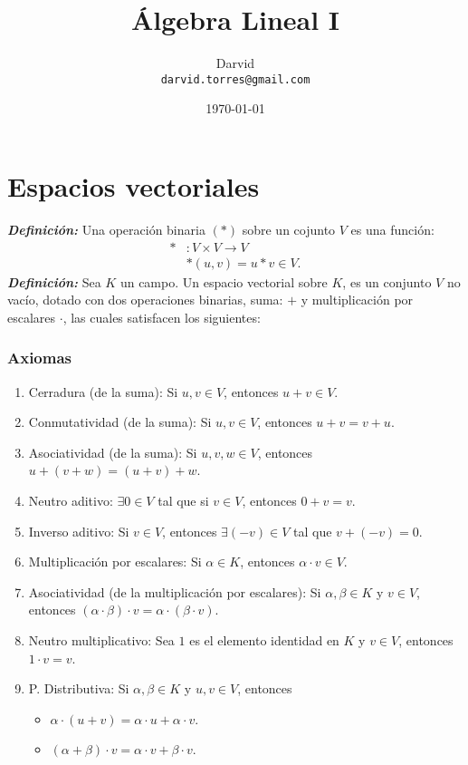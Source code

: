 \documentclass[11pt]{article}
\newcommand{\bfit}[1]{\textbf{\textit{#1}}}
\begin{document}
\title{Álgebra Lineal I}
\author{Darvid \\ \texttt{darvid.torres@gmail.com}}
\date{\today}
\maketitle
\thispagestyle{empty}

\part*{Espacios vectoriales}

\bfit{Definición:} Una operación binaria $(*)$ sobre un cojunto $V$ es una función:
\begin{align*}
 * &: V \times V \to V\\
 &*(u,v) = u*v\in V.
\end{align*}
\bfit{Definición:}  Sea $K$ un campo. Un espacio vectorial sobre $K$, es un conjunto $V$ no vacío, dotado con dos operaciones binarias, suma: $+$ y multiplicación por escalares $\cdot$, las cuales satisfacen los siguientes:

\section*{Axiomas}

\begin{enumerate}
    \item Cerradura (de la suma): Si $u,v\in V$, entonces $u+v \in V$.
    \item Conmutatividad (de la suma): Si $u,v\in V$, entonces $u+v=v+u$.
    \item Asociatividad (de la suma): Si $u,v,w\in V$, entonces $u+(v+w)=(u+v)+w$.
    \item Neutro aditivo: $\exists 0\in V$ tal que si $v\in V$, entonces $0+v=v$.
    \item Inverso aditivo: Si $v\in V$, entonces $\exists (-v)\in V$ tal que $v+(-v)=0$.
    \item Multiplicación por escalares: Si $\alpha \in K$, entonces $\alpha \cdot v\in V$.
    \item Asociatividad (de la multiplicación por escalares): Si $\alpha, \beta\in K$ y $v\in V$, entonces $(\alpha\cdot \beta)\cdot v = \alpha \cdot (\beta \cdot v)$.
    \item Neutro multiplicativo: Sea $1$ es el elemento identidad en $K$ y $v\in V$, entonces $1\cdot v=v$.
    \item P. Distributiva: Si $\alpha, \beta \in K$ y $u,v\in V$, entonces \begin{itemize}
        \item $\alpha \cdot (u+v) = \alpha \cdot u + \alpha \cdot v$.
        \item $(\alpha+\beta) \cdot v = \alpha \cdot v + \beta \cdot v$.
    \end{itemize}
\end{enumerate}
\end{document}
